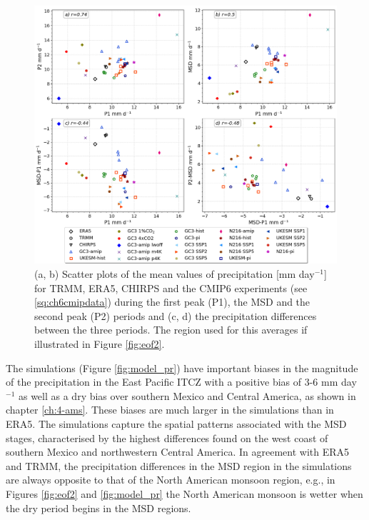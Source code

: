  \begin{figure}[b!]
\includegraphics[width=\linewidth]{figures/dumscatter_2.png}
\caption[Scatter plot of mean precipitation in different parts of seasonal cycle]{(a, b) Scatter plots of the mean values of precipitation [mm day$^{-1}$] for TRMM, ERA5, CHIRPS and the CMIP6 experiments (see \ref{sq:ch6cmipdata}) during the first peak (P1), the MSD and the second peak (P2) periods and (c, d) the precipitation differences between the three periods. The region used for this averages if illustrated in Figure \ref{fig:eof2}.  
  }
\label{fig:scatter_msd}
\end{figure}  
 
The simulations (Figure \ref{fig:model_pr}) have important biases in the magnitude of the  precipitation in the East Pacific ITCZ with a positive bias of 3-6 mm day$^{-1}$ as well as a dry bias over southern Mexico and Central America, as shown in chapter \ref{ch:4-ams}. These biases are much larger in the simulations than in ERA5.
The simulations capture the spatial patterns associated with the MSD stages, characterised by the highest differences found on the west coast of southern Mexico and northwestern Central America.
In agreement with ERA5 and TRMM, the precipitation differences in the MSD region in the simulations are always opposite to that of the North American monsoon region, e.g., in Figures \ref{fig:eof2} and \ref{fig:model_pr} the North American monsoon is wetter when the dry period begins in the MSD regions.%
  


